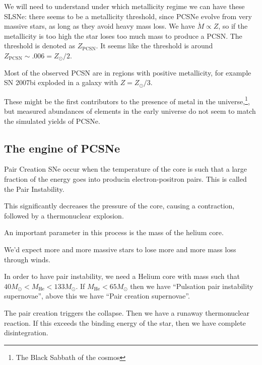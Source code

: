 \documentclass[main.tex]{subfiles}
\begin{document}
We will need to understand under which metallicity regime we can have these SLSNe: there seems to be a metallicity threshold, since PCSNe evolve from very massive stars, as long as they avoid heavy mass loss. 
We have \(\dot{M} \propto Z\), so if the metallicity is too high the star loses too much mass to produce a PCSN. The threshold is denoted as \(Z _{\text{PCSN}}\).
It seems like the threshold is around \(Z _{\text{PCSN}}\sim \num{.006} = Z_{\odot} / 2\).

Most of the observed PCSN are in regions with positive metallicity, for example SN 2007bi exploded in a galaxy with \(Z = Z_{\odot} /3\).

These might be the first contributors to the presence of metal in the universe,\footnote{The Black Sabbath of the cosmos}, but measured abundances of elements in the early universe do not seem to match the simulated yields of PCSNe.

\subsection{The engine of PCSNe}


Pair Creation SNe occur when the temperature of the core is such that a large fraction of the energy goes into producin electron-positron pairs. This is called the Pair Instability.

This significantly decreases the pressure of the core, causing a contraction, followed by a thermonuclear explosion.


An important parameter in this process is the mass of the helium core. 

We'd expect more and more massive stars to lose more and more mass loss through winds. 

In order to have pair instability, we need a Helium core with mass such that \(40 M_{\odot} < M _{\text{He}} < 133 M_{\odot}\).
If \(M _{\text{He}} < 65 M_{\odot}\) then we have ``Pulsation pair instability supernovae'', above this we have ``Pair creation supernovae''. 

The pair creation triggers the collapse. Then we have a runaway thermonuclear reaction. If this exceeds the binding energy of the star, then we have complete disintegration. 
\end{document}
